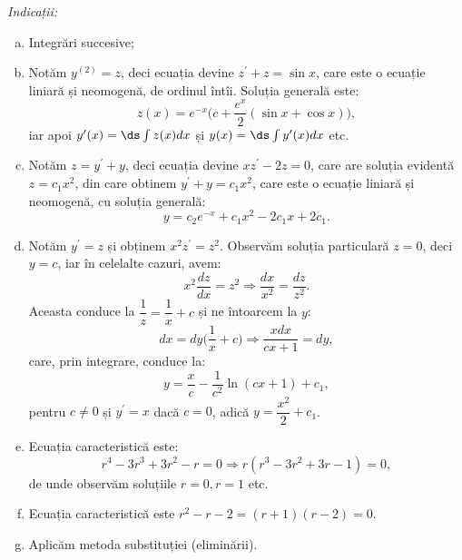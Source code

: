 \emph{Indicații:}
\begin{enumerate}[(a)]
  \item Integrări succesive;
  \item Notăm $ y^{(2)} = z $, deci ecuația devine $ z^\prime + z = \sin x $, care este
    o ecuație liniară și neomogenă, de ordinul întîi. Soluția generală este:
    \[
      z(x) = e^{-x}\Big( c + \dfrac{e^x}{2} (\sin x + \cos x) \Big),
    \]
    iar apoi $ y^\prime(x) = \ds\int z(x) dx $ și $ y(x) = \ds\int y^\prime (x) dx $ etc.
  \item Notăm $ z = y^\prime + y $, deci ecuația devine $ xz^\prime - 2z = 0 $, care
    are soluția evidentă $ z = c_1 x^2 $, din care obtinem $ y^\prime + y = c_1 x^2 $, care
    este o ecuație liniară și neomogenă, cu soluția generală:
    \[
      y = c_2 e^{-x} + c_1 x^2 - 2c_1 x + 2c_1.
    \]
  \item Notăm $ y^\prime = z $ și obținem $ x^2 z^\prime = z^2 $. Observăm soluția particulară
    $ z = 0 $, deci $ y = c $, iar în celelalte cazuri, avem:
    \[
      x^2 \dfrac{dz}{dx} = z^2 \Rightarrow \dfrac{dx}{x^2} = \dfrac{dz}{z^2}.
    \]
    Aceasta conduce la $ \dfrac{1}{z} = \dfrac{1}{x} + c $ și ne întoarcem
    la $ y $:
    \[
      dx = dy \Big( \dfrac{1}{x} + c \Big) \Rightarrow \dfrac{xdx}{cx + 1} = dy,
    \]
    care, prin integrare, conduce la:
    \[
      y = \dfrac{x}{c} - \dfrac{1}{c^2} \ln(cx + 1) + c_1,
    \]
    pentru $ c \neq 0 $ și $ y^\prime = x $ dacă $ c = 0 $, adică $ y = \dfrac{x^2}{2} + c_1 $.
  \item Ecuația caracteristică este:
    \[
      r^4 - 3r^3 + 3r^2 - r = 0 \Rightarrow r(r^3 - 3r^2 + 3r - 1) = 0,
    \]
    de unde observăm soluțiile $ r = 0, r = 1 $ etc.
  \item Ecuația caracteristică este $ r^2 - r - 2 = (r + 1)(r - 2) = 0 $.
  \item Aplicăm metoda substituției (eliminării).
\end{enumerate}


